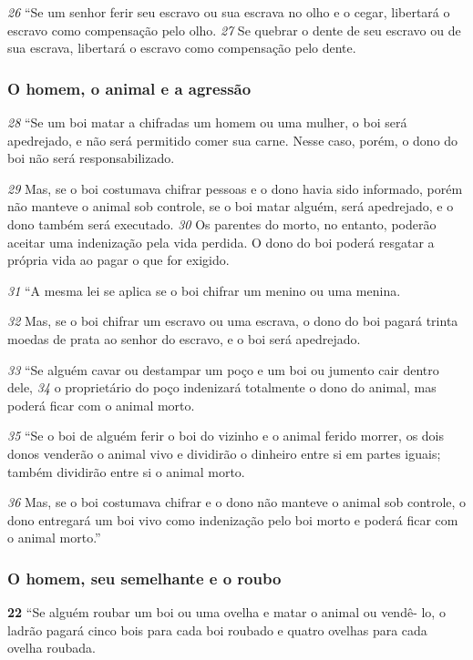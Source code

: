 \smallskip
\textit{\tiny 26}
“Se um senhor ferir seu escravo ou sua escrava no olho e o cegar, libertará o
escravo como compensação pelo olho. 
\textit{\tiny 27}
Se quebrar o dente de seu escravo ou de
sua escrava, libertará o escravo como compensação pelo dente.
   
\bigskip
\subsubsection*{O homem, o animal e a agressão}
\textit{\tiny 28}
“Se um boi matar a chifradas um homem ou uma mulher, o boi será
apedrejado, e não será permitido comer sua carne. Nesse caso, porém, o dono do
boi não será responsabilizado. 

\smallskip
\textit{\tiny 29}
Mas, se o boi costumava chifrar pessoas e o dono
havia sido informado, porém não manteve o animal sob controle, se o boi matar
alguém, será apedrejado, e o dono também será executado. 
\textit{\tiny 30}
Os parentes do
morto, no entanto, poderão aceitar uma indenização pela vida perdida. O dono do
boi poderá resgatar a própria vida ao pagar o que for exigido.
   
\smallskip
\textit{\tiny 31}
“A mesma lei se aplica se o boi chifrar um menino ou uma menina. 

\smallskip
\textit{\tiny 32}
Mas, se
o boi chifrar um escravo ou uma escrava, o dono do boi pagará trinta moedas de
prata ao senhor do escravo, e o boi será apedrejado.
   
\smallskip
\textit{\tiny 33}
“Se alguém cavar ou destampar um poço e um boi ou jumento cair dentro
dele, 
\textit{\tiny 34}
o proprietário do poço indenizará totalmente o dono do animal, mas
poderá ficar com o animal morto.
   
\smallskip
\textit{\tiny 35}
“Se o boi de alguém ferir o boi do vizinho e o animal ferido morrer, os dois
donos venderão o animal vivo e dividirão o dinheiro entre si em partes iguais;
também dividirão entre si o animal morto. 

\smallskip
\textit{\tiny 36}
Mas, se o boi costumava chifrar e o
dono não manteve o animal sob controle, o dono entregará um boi vivo como
indenização pelo boi morto e poderá ficar com o animal morto.”
 
\bigskip
\subsubsection*{O homem, seu semelhante e o roubo}
\textbf{\large 22}
           “Se alguém roubar um boi ou uma ovelha e matar o animal ou vendê-
lo, o ladrão pagará cinco bois para cada boi roubado e quatro ovelhas para cada
ovelha roubada. 

